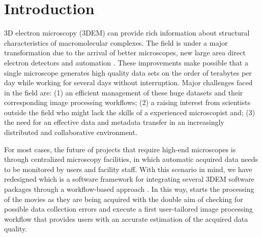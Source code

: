 
\section{Introduction}

3D electron microscopy (3DEM)  can provide rich information about structural characteristics of macromolecular complexes. The field is under a major transformation due to the arrival of better microscopes, new large area direct electron detectors and automation \citep{kuhlbrandt2014a, Kuhlbrandt2014b}. These improvements make possible that a single microscope generates high quality data sets on the order of terabytes per day \citep{Saibil2015} while working for several days without interruption. Major challenges faced in the field are: (1) an efficient management of these huge datasets and their corresponding image processing workflows; (2) a raising interest from scientists outside the field who might lack the skills of a experienced microscopist and; (3) the need for an effective data and metadata transfer in an increasingly distributed and collaborative environment. %



For most cases, the future of projects that require high-end microscopes is through centralized microscopy facilities, in which automatic acquired data needs to be monitored by users and facility staff.  With this scenario in mind, we have redesigned \scipion which is a software framework for integrating several 3DEM software packages through a workflow-based approach \citep{delarosatrevin2016}. %
In this way, \scipion starts the processing of the movies as they are being acquired with the double aim of checking for possible data collection errors and execute a first user-tailored image processing workflow that provides users with an accurate estimation of the acquired data quality.

